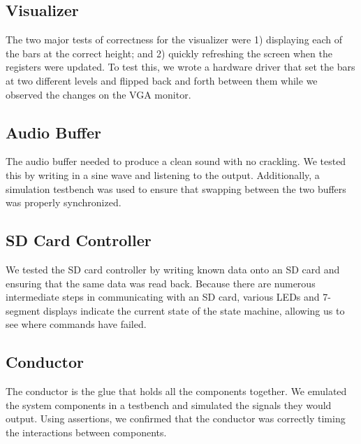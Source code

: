 \documentclass{article}
\begin{document}
\subsection{Visualizer}

The two major tests of correctness for the visualizer were 1) displaying each
of the bars at the correct height; and 2) quickly refreshing the screen when
the registers were updated. To test this, we wrote a hardware driver that set
the bars at two different levels and flipped back and forth between them while
we observed the changes on the VGA monitor.

\subsection{Audio Buffer}

The audio buffer needed to produce a clean sound with no crackling. We tested
this by writing in a sine wave and listening to the output. Additionally, a
simulation testbench was used to ensure that swapping between the two buffers
was properly synchronized.

\subsection{SD Card Controller}

We tested the SD card controller by writing known data onto an SD card and 
ensuring that the same data was read back. Because there are numerous
intermediate steps in communicating with an SD card, various LEDs and 7-segment
displays indicate the current state of the state machine, allowing us to see
where commands have failed.

\subsection{Conductor}

The conductor is the glue that holds all the components together. We emulated
the system components in a testbench and simulated the signals they would
output. Using assertions, we confirmed that the conductor was correctly timing
the interactions between components.
\end{document}
